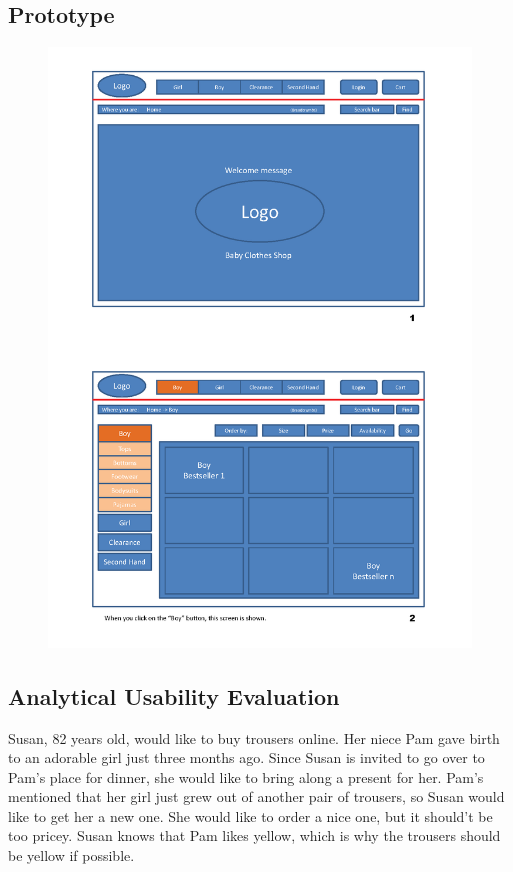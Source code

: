 \subsection{Prototype}
\begin{figure}[H]
\begin{center}
\includegraphics[scale=0.80]{Prototype/HCI_Prototype_2_1_1.png}
\end{center}
\end{figure}
\newpage


\subsection{Analytical Usability Evaluation}
Susan, 82 years old, would like to buy trousers online. Her niece Pam gave birth to an adorable girl just three months ago. Since Susan is invited to go over to Pam's place for dinner, she would like to bring along a present for her. Pam's mentioned that her girl just grew out of another pair of trousers, so Susan would like to get her a new one. She would like to order a nice one, but it should't be too pricey. Susan knows that Pam likes yellow, which is why the trousers should be yellow if possible. 


